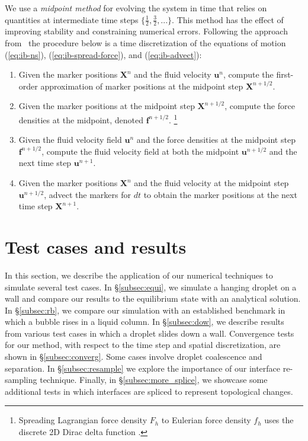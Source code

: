 \documentclass{jfm}
\newcommand{\charles}[1]{\todo[inline,color=blue!40]{Charles: #1}}
\begin{document}

We use a \textit{midpoint method} for evolving the system in time that relies on quantities at intermediate time steps $\{\frac{1}{2}, \frac{3}{2}, ...\}$. This method has the effect of improving stability and constraining numerical errors. Following the approach from~\citep{peskin2002immersed, ib_matlab} the procedure below is a time discretization of the equations of motion (\ref{eq:ib-ns}), (\ref{eq:ib-spread-force}), and (\ref{eq:ib-advect}): 
\begin{enumerate}
    \item Given the marker positions $\bm{X}^n$ and the fluid velocity $\bm{u}^n$, compute the first-order approximation of marker positions at the midpoint step $\bm{X}^{n + 1/2}$. 
    \item Given the marker positions at the midpoint step $\bm{X}^{n + 1/2}$, compute the force densities at the midpoint, denoted $\bm{f}^{n + 1/2}$. \footnote{Spreading Lagrangian force density $F_h$ to Eulerian force density $f_h$ uses the discrete 2D Dirac delta function \citep{peskin2002immersed}.}
    \item Given the fluid velocity field $\bm{u}^n$ and the force densities at the midpoint step $\bm{f}^{n + 1/2}$, compute the fluid velocity field at both the midpoint $\bm{u}^{n + 1/2}$ and the next time step $\bm{u}^{n + 1}$. 
    \item Given the marker positions $\bm{X}^n$ and the fluid velocity at the midpoint step $\bm{u}^{n + 1/2}$, advect the markers for $dt$ to obtain the marker positions at the next time step $\bm{X}^{n + 1}$. 
\end{enumerate}
\section {Test cases and results\label{sec:tests}}
In this section, we describe the application of our numerical techniques to simulate several test cases. In \S\ref{subsec:equi}, we simulate a hanging droplet on a wall and compare our results to the equilibrium state with an analytical solution. In \S\ref{subsec:rb}, we compare our simulation with an established benchmark in which a bubble rises in a liquid column. In \S\ref{subsec:dow}, we describe results from various test cases in which a droplet slides down a wall. Convergence tests for our method, with respect to the time step and spatial discretization, are shown in \S\ref{subsec:converg}. Some cases involve droplet coalescence and separation. In \S\ref{subsec:resample} we explore the importance of our interface re-sampling technique. Finally, in \S\ref{subsec:more_splice}, we showcase some additional tests in which interfaces are spliced to represent topological changes. 
\end{document}
